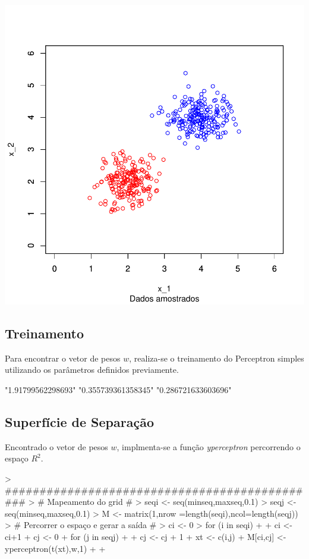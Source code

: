 \documentclass{article}
\begin{document}
\includegraphics{perceptron-002}

\subsection{Treinamento}
Para encontrar o vetor de pesos $w$, realiza-se o treinamento do Perceptron simples utilizando os parâmetros definidos previamente.
\begin{Schunk}
\begin{Soutput}
[1] "1.91799562298693"  "0.355739361358345" "0.286721633603696"
\end{Soutput}
\end{Schunk}

\subsection{Superfície de Separação}
Encontrado o vetor de pesos $w$, implmenta-se a função \textit{yperceptron} percorrendo o espaço $R^2$.
\begin{Schunk}
\begin{Sinput}
> ##############################################
> # Mapeamento do grid  #
> seqi <- seq(minseq,maxseq,0.1)
> seqj <- seq(minseq,maxseq,0.1)
> M <- matrix(1,nrow =length(seqi),ncol=length(seqj))
> # Percorrer o espaço e gerar a saída #
> ci <- 0
> for (i in seqi)
+ {
+   ci <- ci+1
+   cj <- 0
+   for (j in seqj)
+   {
+     cj <- cj + 1
+     xt <- c(i,j)
+     M[ci,cj] <- yperceptron(t(xt),w,1)
+   }
+ }
\end{Sinput}
\end{Schunk}
\end{document}
